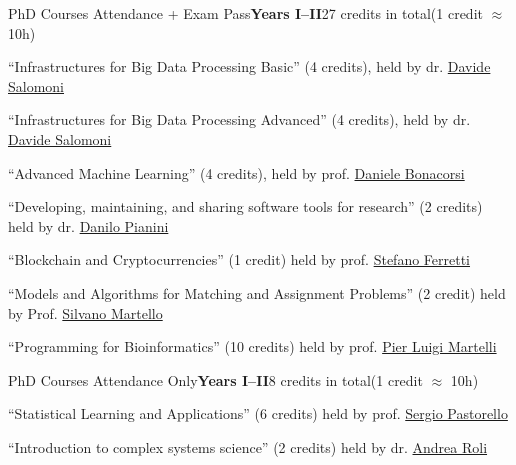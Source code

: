 \begin{activity}{PhD Courses Attendance + Exam Pass}{\textbf{Years I--II}}{27 credits in total}{(1 credit $\approx$ 10h)}
    \item ``Infrastructures for Big Data Processing Basic'' (4 credits), held by dr. \href{mailto:davide.salomoni@cnaf.infn.it}{Davide Salomoni}
    \item ``Infrastructures for Big Data Processing Advanced'' (4 credits), held by dr. \href{mailto:davide.salomoni@cnaf.infn.it}{Davide Salomoni}
    \item ``Advanced Machine Learning'' (4 credits), held by prof. \href{mailto:daniele.bonacorsi@bo.infn.it}{Daniele Bonacorsi}
    \item ``Developing, maintaining, and sharing software tools for research'' (2 credits) held by dr. \href{mailto:danilo.pianini@unibo.it}{Danilo Pianini}
    \item ``Blockchain and Cryptocurrencies'' (1 credit) held by prof. \href{mailto:stefano.ferretti@unibo.it}{Stefano Ferretti}
    \item ``Models and Algorithms for Matching and Assignment Problems'' (2 credit) held by Prof. \href{mailto:pierluigi.martelli@unibo.it}{Silvano Martello}
    \item ``Programming for Bioinformatics'' (10 credits) held by prof. \href{mailto:silvano.martello@unibo.it}{Pier Luigi Martelli}
\end{activity}

\begin{activity}{PhD Courses Attendance Only}{\textbf{Years I--II}}{8 credits in total}{(1 credit $\approx$ 10h)}
    \item ``Statistical Learning and Applications'' (6 credits) held by prof.  \href{mailto:sergio.pastorello@unibo.it}{Sergio Pastorello}
    \item ``Introduction to complex systems science'' (2 credits) held by dr. \href{mailto:andrea.roli@unibo.it}{Andrea Roli}
\end{activity}

